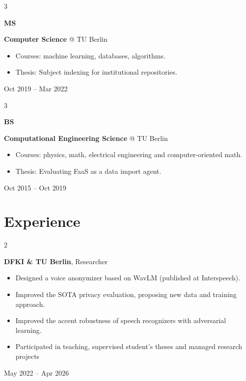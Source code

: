 \documentclass[10pt, letterpaper]{article}
\newenvironment{highlights}{
    \begin{itemize}[
        topsep=0.10 cm,
        parsep=0.10 cm,
        partopsep=0pt,
        itemsep=0pt,
        leftmargin=0.4 cm + 10pt
    ]
}{
    \end{itemize}
} %
\newenvironment{twocolentry}[2][]{
    \onecolentry
    \def\secondColumn{#2}
    \setcolumnwidth{\fill, 4.5 cm}
    \begin{paracol}{2}
}{
    \switchcolumn \raggedleft \secondColumn
    \end{paracol}
    \endonecolentry
} %
\newenvironment{threecolentry}[3][]{
    \onecolentry
    \def\thirdColumn{#3}
    \setcolumnwidth{1 cm, \fill, 4.5 cm}
    \begin{paracol}{3}
    {\raggedright #2} \switchcolumn
}{
    \switchcolumn \raggedleft \thirdColumn
    \end{paracol}
    \endonecolentry
} %
\begin{document}
        \begin{threecolentry}{\textbf{MS}}{Oct 2019 – Mar 2022}
            \textbf{Computer Science} @ TU Berlin
            \begin{highlights}
                \item Courses: machine learning, databases, algorithms.
                \item Thesis: Subject indexing for institutional repositories.
            \end{highlights}
        \end{threecolentry}

        \begin{threecolentry}{\textbf{BS}}{Oct 2015 – Oct 2019}
            \textbf{Computational Engineering Science} @ TU Berlin
            \begin{highlights}
                \item Courses: physics, math, electrical engineering and computer-oriented math.
                \item Thesis: Evaluating FaaS as a data import agent.
            \end{highlights}
        \end{threecolentry}
    
    \section{Experience}
   
        \begin{twocolentry}{May 2022 – Apr 2026}
            \textbf{DFKI \& TU Berlin}, Researcher
            \begin{highlights}
                \item Designed a voice anonymizer based on WavLM (published at Interspeech).
                \item Improved the SOTA privacy evaluation, proposing new data and training approach.
                \item Improved the accent robustness of speech recognizers with adversarial learning.
                \item Participated in teaching, supervised student's theses and managed research projects
            \end{highlights}
        \end{twocolentry}

        \vspace{0.1 cm}
\end{document}
